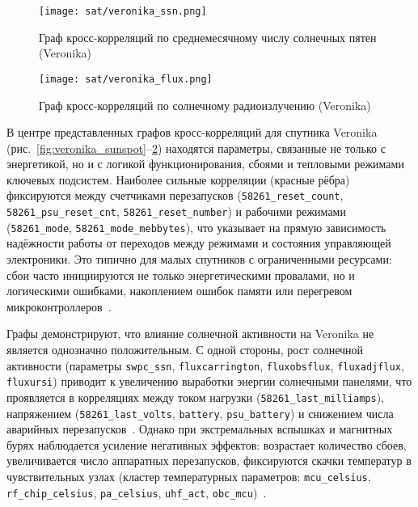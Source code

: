 \begin{figure}[H]
	\centering
	\texttt{[image: sat/veronika\_ssn.png]}
	\caption{Граф кросс-корреляций по среднемесячному числу солнечных пятен (Veronika)}
	\label{fig:veronika_ssn}
\end{figure}

\begin{figure}[H]
	\centering
	\texttt{[image: sat/veronika\_flux.png]}
	\caption{Граф кросс-корреляций по солнечному радиоизлучению (Veronika)}
	\label{fig:veronika_flux}
\end{figure}


В центре представленных графов кросс-корреляций для спутника Veronika
(рис.~\ref{fig:veronika_sunspot}--\ref{fig:veronika_flux}) находятся параметры,
связанные не только с энергетикой, но и с логикой функционирования, сбоями и
тепловыми режимами ключевых подсистем. Наиболее сильные корреляции (красные
рёбра) фиксируются между счетчиками перезапусков (\texttt{58261\_reset\_count},
\texttt{58261\_psu\_reset\_cnt}, \texttt{58261\_reset\_number}) и рабочими
режимами (\texttt{58261\_mode}, \texttt{58261\_mode\_mebbytes}), что указывает
на прямую зависимость надёжности работы от переходов между режимами и состояния
управляющей электроники. Это типично для малых спутников с ограниченными
ресурсами: сбои часто инициируются не только энергетическими провалами, но и
логическими ошибками, накоплением ошибок памяти или перегревом
микроконтроллеров~\cite{spacemanic_veronika, nanosats_veronika}.

Графы демонстрируют, что влияние солнечной активности на Veronika не является
однозначно положительным. С одной стороны, рост солнечной активности (параметры
\texttt{swpc\_ssn}, \texttt{fluxcarrington}, \texttt{fluxobsflux},
\texttt{fluxadjflux}, \texttt{fluxursi}) приводит к увеличению выработки энергии
солнечными панелями, что проявляется в корреляциях между током нагрузки
(\texttt{58261\_last\_milliamps}), напряжением (\texttt{58261\_last\_volts},
\texttt{battery}, \texttt{psu\_battery}) и снижением числа аварийных
перезапусков~\cite{spacemanic_veronika, nanosats_veronika}. Однако при
экстремальных вспышках и магнитных бурях наблюдается усиление негативных
эффектов: возрастает количество сбоев, увеличивается число аппаратных
перезапусков, фиксируются скачки температур в чувствительных узлах (кластер
температурных параметров: \texttt{mcu\_celsius}, \texttt{rf\_chip\_celsius},
\texttt{pa\_celsius}, \texttt{uhf\_act}, \texttt{obc\_mcu})~\cite{nasa_soa,
	stehlikova_veronika}.

